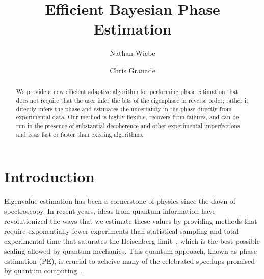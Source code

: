 \documentclass[aps,pra,amsmath,twocolumn,amssymb,superscriptaddress]{revtex4-1}
\begin{document}

\title{Efficient Bayesian Phase Estimation}
\author{Nathan Wiebe}

\author{Chris Granade}

\begin{abstract}
    We provide a new efficient adaptive algorithm for performing phase
    estimation that does not require that the user infer the bits of the
    eigenphase in reverse order; rather it directly infers the phase and
    estimates the uncertainty in the phase directly from experimental data. Our
    method is highly flexible, recovers from failures, and can be run in the
    presence of substantial decoherence and other experimental imperfections
    and is as fast or faster than existing algorithms.
\end{abstract}

\maketitle

\section{Introduction}
\label{sec:intro}

Eigenvalue estimation has been a cornerstone of physics since the dawn of spectroscopy.  In recent years, ideas from quantum information have revolutionized the ways that we estimate these values by providing methods that require exponentially fewer experiments than statistical sampling and total experimental time that saturates the Heisenberg limit~\cite{berry_optimal_2000,higgins2007entanglement,hentschel_machine_2010}, which is the best possible scaling allowed by quantum mechanics.  This quantum approach, known as phase estimation (PE), is crucial to acheive many of the celebrated speedups promised by quantum computing~\cite{shor_polynomial-time_1995,BHM+02,ADL+05,harrow2009quantum,lanyon2010towards}.
\end{document}
